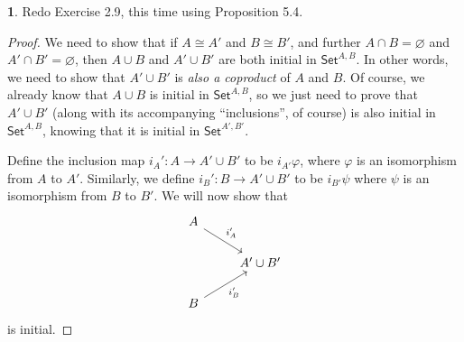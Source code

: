 \documentclass{article}
\theoremstyle{definition}
\newtheorem{ex}{}[section]
\begin{document}
\begin{ex}
	Redo Exercise 2.9, this time using Proposition 5.4.
\end{ex}
\begin{proof}
	We need to show that if $A \cong A'$ and $B \cong B'$, and further $A \cap B = \varnothing$ and $A' \cap B' = \varnothing$, then $A \cup B$ and $A' \cup B'$ are both initial in $\mathsf{Set}^{A,B}$.
	In other words, we need to show that $A' \cup B'$ is \textit{also a coproduct} of $A$ and $B$.
	Of course, we already know that $A \cup B$ is initial in $\mathsf{Set}^{A,B}$, so we just need to prove that $A' \cup B'$ (along with its accompanying ``inclusions'', of course) is also initial in $\mathsf{Set}^{A,B}$, knowing that it is initial in $\mathsf{Set}^{A',B'}$.

	Define the inclusion map $i_A' : A \to A' \cup B'$ to be $i_{A'}\varphi$, where $\varphi$ is an isomorphism from $A$ to $A'$.
	Similarly, we define $i_B' : B \to A' \cup B'$ to be $i_{B'}\psi$ where $\psi$ is an isomorphism from $B$ to $B'$.
	We will now show that \begin{equation*}
		\begin{tikzcd}
			A \arrow[dr, "i_A'"] \\
			& A' \cup B' \\
			B \arrow[ur, "i_B'"']
		\end{tikzcd}
	\end{equation*}
	is initial.


\end{proof}
\end{document}
